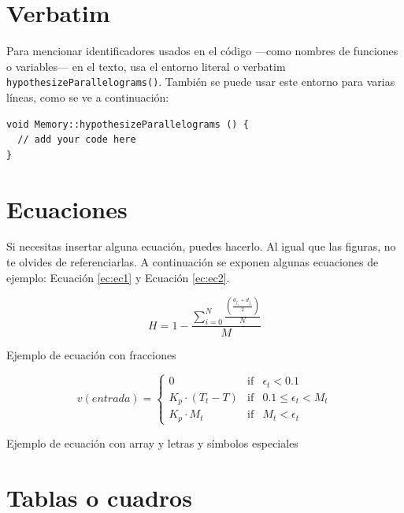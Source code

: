\section{Verbatim}

Para mencionar identificadores usados en el código ---como nombres de funciones o variables--- en el texto, usa el entorno literal o verbatim \verb|hypothesizeParallelograms()|. También se puede usar este entorno para varias líneas, como se ve a continuación:

\begin{verbatim}
void Memory::hypothesizeParallelograms () {
  // add your code here
}
\end{verbatim}

\section{Ecuaciones}

Si necesitas insertar alguna ecuación, puedes hacerlo. Al igual que las figuras, no te olvides de referenciarlas. A continuación se exponen algunas ecuaciones de ejemplo: Ecuación \ref{ec:ec1} y Ecuación \ref{ec:ec2}.

\begin{myequation}[h]
\begin{equation}
H = 1 - \frac{\sum_{i=0}^{N}\frac{(\frac{d_{j_s} + d_{j_e}}{2})}{N}}{M}
\nonumber
\label{ec:ec1}
\end{equation}
\caption[Ejemplo de ecuación con fracciones]{Ejemplo de ecuación con fracciones}
\end{myequation} 

\begin{myequation}[h]
\begin{equation}
v(entrada)= \left\{
	\begin{array}{lcc}
		0 & \mbox{if} & \epsilon_t < 0.1\\
		K_p\cdot{(T_{t}-T)} & \mbox{if}& 0.1 \leq \epsilon_t < M_t\\
		K_p \cdot M_t & \mbox{if}& M_t < \epsilon_t
	\end{array}
\right.
\label{ec:ec2}
\end{equation}
\caption[Ejemplo de ecuación con array y letras y símbolos especiales]{Ejemplo de ecuación con array y letras y símbolos especiales}
\end{myequation}

\section{Tablas o cuadros}

